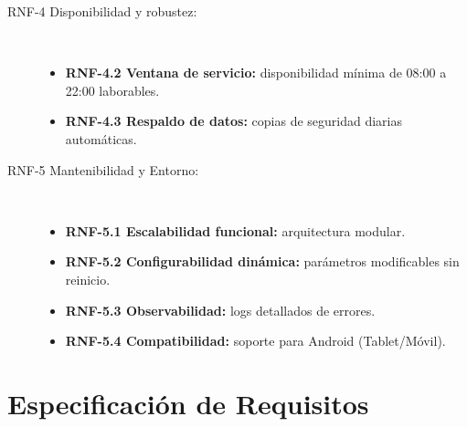 \begin{description}
    \item[RNF-4 Disponibilidad y robustez:] \mbox{} \\
    \begin{itemize}
        \item \textbf{RNF-4.2 Ventana de servicio:} disponibilidad mínima de 08:00 a 22:00 laborables.
        \item \textbf{RNF-4.3 Respaldo de datos:} copias de seguridad diarias automáticas.
    \end{itemize}


    \item[RNF-5 Mantenibilidad y Entorno:] \mbox{} \\
    \begin{itemize}
        \item \textbf{RNF-5.1 Escalabilidad funcional:} arquitectura modular.
        \item \textbf{RNF-5.2 Configurabilidad dinámica:} parámetros modificables sin reinicio.
        \item \textbf{RNF-5.3 Observabilidad:} logs detallados de errores.
        \item \textbf{RNF-5.4 Compatibilidad:} soporte para Android (Tablet/Móvil).
    \end{itemize}
\end{description}
\clearpage

\section{Especificación de Requisitos}

